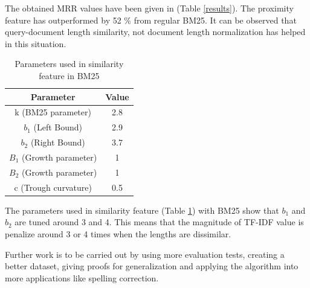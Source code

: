 \documentclass[11pt]{article}
\begin{document}
	The obtained MRR values have been given in (Table \ref{results}). The proximity feature has outperformed by 52 \% from regular BM25. It can be observed that query-document length similarity, not document length normalization has helped in this situation. 
	
	\begin{table}[H]
		\centering
		\begin{tabular}{|c|c|}
			\hline
			\multicolumn{1}{|c|}{\textbf{Parameter}} & \multicolumn{1}{c|}{\textbf{Value}} \\ \hline
			k (BM25 parameter)                                        & 2.8                                 \\ \hline
			$b_1$ (Left Bound)                                    & 2.9                                 \\ \hline
			$b_2$ (Right Bound)                                   & 3.7                                 \\ \hline
			$B_1$ (Growth parameter)                                   & 1                                   \\ \hline
			$B_2$  (Growth parameter)                                  & 1                                   \\ \hline
			c (Trough curvature)
			& 0.5                                 \\ \hline
		\end{tabular}
		\caption{Parameters used in similarity feature in BM25}
		\label{my-label}
	\end{table}
	
	The parameters used in similarity feature (Table \ref{my-label}) with BM25 show that $b_1$ and $b_2$  are tuned around 3 and 4. This means that the magnitude of TF-IDF value is penalize around 3 or 4 times when the lengths are dissimilar.
	
	Further work is to be carried out by using more evaluation tests, creating a better dataset, giving proofs for generalization and applying the algorithm into more applications like spelling correction.
	
	
	
	
	
	
	
\end{document}
